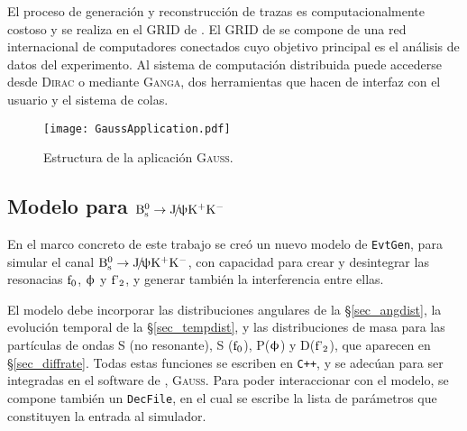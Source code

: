 El proceso de generación y reconstrucción de trazas es computacionalmente costoso y se realiza en el GRID de \lhcb. 
El GRID de \lhcb se compone de una red internacional de computadores conectados cuyo objetivo principal es el análisis de datos del experimento. Al sistema de computación distribuida puede accederse desde \textsc{Dirac} o mediante \textsc{Ganga}, dos herramientas que hacen de interfaz con el usuario y el sistema de colas.





\begin{figure}[H]
\centering
\texttt{[image: GaussApplication.pdf]}
\caption{Estructura de la aplicación  \textsc{Gauss}.}	 \label{fig_gaussapp}
\end{figure}




\subsection{Modelo para $\text{B}{}_{\text{s}}^{0} \rightarrow \text{J}\!/\!\uppsi \text{K}{}^{+}\text{K}{}^{-}$} %
\label{sec:Bs2JpsiKKmodel}

En el marco concreto  de este trabajo se creó un nuevo modelo de \texttt{EvtGen}, para simular el canal $\text{B}{}_{\text{s}}^{0} \rightarrow \text{J}\!/\!\uppsi \text{K}{}^{+}\text{K}{}^{-}$, con capacidad para crear y desintegrar las resonacias $\text{f}_0$, $\upphi$ y $\text{f'}_2$, y \color{vero} generar también la interferencia entre ellas. \color{norm} 

El modelo debe incorporar las distribuciones angulares de la \S \ref{sec_angdist}, la evolución temporal de la \S \ref{sec_tempdist}, y las distribuciones de masa para las partículas de ondas S (no resonante), S ($\text{f}_0$), P($\upphi$) y D($\text{f'}_2$), que aparecen en \S \ref{sec_diffrate}.  Todas estas funciones se escriben en \texttt{C++}, y se adecúan para ser integradas en el software de \lhcb, \textsc{Gauss}. Para poder interaccionar con el modelo, se compone también un \texttt{DecFile}, en el cual se escribe la lista de parámetros que constituyen la entrada al simulador.

